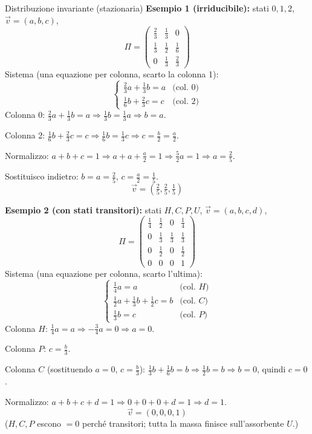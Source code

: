 \documentclass[11pt]{article}
\begin{document}
\begin{concetto}[barPurple]{Distribuzione invariante (stazionaria)}
\textbf{Esempio 1 (irriducibile):} stati $0,1,2$, $\vec v=(a,b,c)$,
$$\Pi = \begin{pmatrix} \frac23 & \frac13 & 0 \\ \frac13 & \frac12 & \frac16 \\ 0 & \frac13 & \frac23 \end{pmatrix}$$
Sistema (una equazione per colonna, scarto la colonna 1):
$$\begin{cases}
\frac23a+\frac13b=a & \text{(col. 0)}\\[2pt]
\frac16b+\frac23c=c & \text{(col. 2)}
\end{cases}$$
Colonna 0: $\frac23a+\frac13b=a \Rightarrow \frac13b=\frac13a \Rightarrow b=a$.

Colonna 2: $\frac16b+\frac23c=c \Rightarrow \frac16b=\frac13c \Rightarrow c=\frac{b}{2}=\frac{a}{2}$.

Normalizzo: $a+b+c=1 \Rightarrow a+a+\frac{a}{2}=1 \Rightarrow \frac52a=1 \Rightarrow a=\frac25$.

Sostituisco indietro: $b=a=\frac25$, $c=\frac a2=\frac15$.
$$\vec v=\left(\tfrac25,\tfrac25,\tfrac15\right)$$

\textbf{Esempio 2 (con stati transitori):} stati $H,C,P,U$, $\vec v=(a,b,c,d)$,
$$\Pi = \begin{pmatrix} \frac14 & \frac12 & 0 & \frac14 \\ 0 & \frac13 & \frac13 & \frac13 \\ 0 & \frac12 & 0 & \frac12 \\ 0 & 0 & 0 & 1 \end{pmatrix}$$
Sistema (una equazione per colonna, scarto l'ultima):
$$\begin{cases}
\frac14 a = a & \text{(col. } H\text{)}\\[2pt]
\frac12 a + \frac13 b + \frac12 c = b & \text{(col. } C\text{)}\\[2pt]
\frac13 b = c & \text{(col. } P\text{)}
\end{cases}$$
Colonna $H$: $\frac14 a = a \Rightarrow -\frac34a=0 \Rightarrow a=0$.

Colonna $P$: $c=\frac{b}{3}$.

Colonna $C$ (sostituendo $a=0$, $c=\frac b3$): $\frac13 b + \frac16 b = b \Rightarrow \frac12 b = b \Rightarrow b=0$, quindi $c=0$.

Normalizzo: $a+b+c+d=1 \Rightarrow 0+0+0+d=1 \Rightarrow d=1$.
$$\vec v = (0,0,0,1)$$
($H,C,P$ escono $=0$ perch\'e transitori; tutta la massa finisce sull'assorbente $U$.)
\end{concetto}
\end{document}
